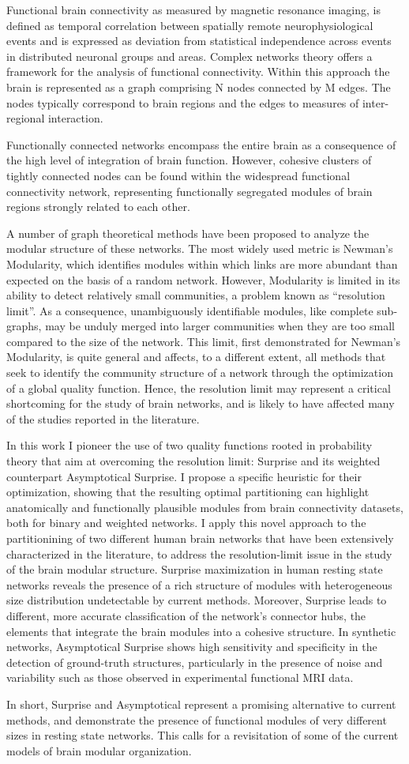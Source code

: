 Functional brain connectivity as measured by magnetic resonance imaging, is defined as temporal correlation between spatially remote neurophysiological events and is expressed as deviation from statistical independence across events in distributed neuronal groups and areas.
Complex networks theory offers a framework for the analysis of functional connectivity.
Within this approach the brain is represented as a graph comprising N nodes connected by M edges.
The nodes typically correspond to brain regions and the edges to measures of inter-regional interaction.

Functionally connected networks encompass the entire brain as a consequence of the high level of integration of brain function.
However, cohesive clusters of tightly connected nodes can be found within the widespread functional connectivity network, representing functionally segregated modules of brain regions strongly related to each other.

A number of graph theoretical methods have been proposed to analyze the modular structure of these networks.
The most widely used metric is Newman's Modularity, which identifies modules within which links are more abundant than expected on the basis of a random network.
However, Modularity is limited in its ability to detect relatively small communities, a problem known as ``resolution limit''.
As a consequence, unambiguously identifiable modules, like complete sub-graphs, may be unduly merged into larger communities when they are too small compared to the size of the network.
This limit, first demonstrated for Newman's Modularity, is quite general and affects, to a different extent, all methods that seek to identify the community structure of a network through the optimization of a global quality function.
Hence, the resolution limit may represent a critical shortcoming for the study of brain networks, and is likely to have affected many of the studies reported in the literature.

In this work I pioneer the use of two quality functions rooted in probability theory that aim at overcoming the resolution limit: Surprise and its weighted counterpart Asymptotical Surprise.
I propose a specific heuristic for their optimization, showing that the resulting optimal partitioning can highlight anatomically and functionally plausible modules from brain connectivity datasets, both for binary and weighted networks. 
I apply this novel approach to the partitionining of two different human brain networks that have been extensively characterized in the literature, to address the resolution-limit issue in the study of the brain modular structure.
Surprise maximization in human resting state networks reveals the presence of a rich structure of modules with heterogeneous size distribution undetectable by current methods. Moreover, Surprise leads to different, more accurate classification of the network's connector hubs, the elements that integrate the brain modules into a cohesive structure.
In synthetic networks, Asymptotical Surprise shows high sensitivity and specificity in the detection of ground-truth structures, particularly in the presence of noise and variability such as those observed in experimental functional MRI data.

In short, Surprise and Asymptotical represent a promising alternative to current methods, and demonstrate the presence of functional modules of very different sizes in resting state networks.
This calls for a revisitation of some of the current models of brain modular organization.